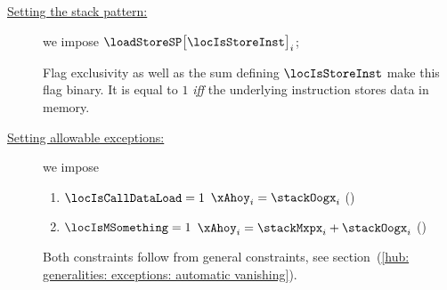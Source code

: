 \begin{center}
\end{center}

\begin{description}
	\item[\underline{Setting the stack pattern:}]
		we impose $\loadStoreSP\big[ \locIsStoreInst \big]_{i}$;

		\saNote{}
		Flag exclusivity as well as the sum defining $\locIsStoreInst$ make this flag binary.
		It is equal to $1$ \emph{iff} the underlying instruction stores data in memory.
	\item[\underline{Setting allowable exceptions:}]
		we impose
		\begin{enumerate}
			\item \If $\locIsCallDataLoad = 1$ \Then $\xAhoy _{i} =                   \stackOogx _{i}$ \quad (\trash)
			\item \If $\locIsMSomething   = 1$ \Then $\xAhoy _{i} = \stackMxpx _{i} + \stackOogx _{i}$ \quad (\trash)
		\end{enumerate}
		\saNote{}
		Both constraints  follow from general constraints, see section~(\ref{hub: generalities: exceptions: automatic vanishing}).


\end{description}
